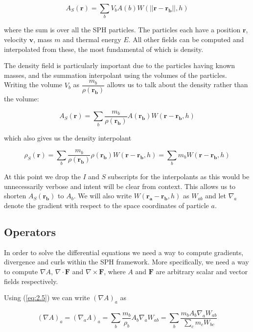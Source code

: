 \documentclass[../main.tex]{subfiles}
\begin{document}
\begin{equation}
    A_S(\bm{r})
    = \sum_{b} V_b A(b) W(||\bm{r} - \bm{r_b}||, h)
\end{equation}

where the sum is over all the SPH particles. The particles each have a position $\bm{r}$, velocity
$\bm{v}$, mass $m$ and thermal energy $E$. All other fields can be computed and interpolated
from these, the most fundamental of which is density.

The density field is particularly important due to the particles having known masses, and the
summation interpolant using the volumes of the particles. Writing the volume $V_b$ as
$\dfrac{m_b}{\rho(\bm{r_b})}$ allows us to talk about the density rather than the volume:

\begin{equation} \label{eq:2.5}
    A_S(\bm{r})
    = \sum_{b} \frac{m_b}{\rho(\bm{r_b})} A(\bm{r_b}) W(\bm{r} - \bm{r_b}, h)
\end{equation}

which also gives us the density interpolant

\begin{equation}
    \rho_S(\bm{r})
    = \sum_{b} \frac{m_b}{\rho(\bm{r_b})} \rho(\bm{r_b}) W(\bm{r} - \bm{r_b}, h)
    = \sum_{b} m_b W(\bm{r} - \bm{r_b}, h)
\end{equation}

At this point we drop the $I$ and $S$ subscripts for the interpolants as this would be
unnecessarily verbose and intent will be clear from context. This allows us to shorten
$A_S(\bm{r_b})$ to $A_b$. We will also write $W(\bm{r_a} - \bm{r_b}, h)$ as $W_{ab}$ and let
$\nabla_a$ denote the gradient with respect to the space coordinates of particle $a$.

\subsection{Operators}
In order to solve the differential equations we need a way to compute gradients, divergence and
curls within the SPH framework. More specifically, we need a way to compute
$\nabla A$, $\nabla\cdot\bm{F}$ and $\nabla\times\bm{F}$, where $A$ and $\bm{F}$ are arbitrary
scalar and vector fields respectively.

Using (\ref{eq:2.5}) we can write $(\nabla A)_a$ as

\begin{equation} \label{eq:2.7}
    (\nabla A)_a
    = (\nabla_a A)_a
    = \sum_b \frac{m_b}{\rho_b} A_b \nabla_a W_{ab}
    = \sum_b \frac{m_b A_b \nabla_a W_{ab}}{\sum_c m_c W_{bc}}
\end{equation}
\end{document}
